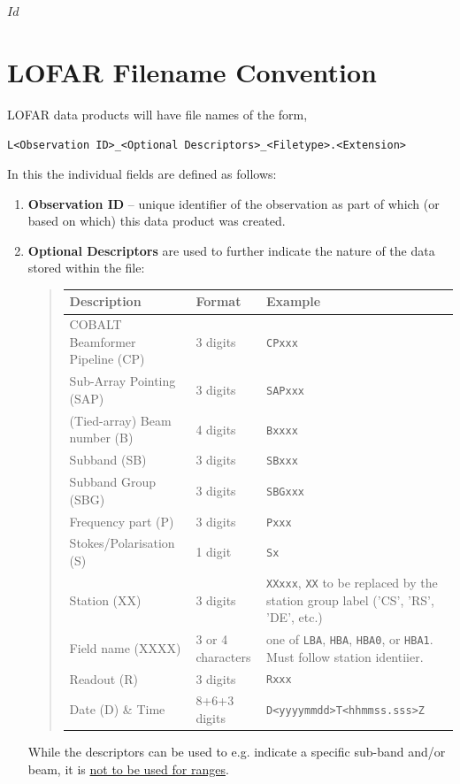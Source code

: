 \svnInfo $Id$

\section{LOFAR Filename Convention}
\label{sec:filenames}

LOFAR data products will have file names of the form,

\begin{center}
  \verb|L<Observation ID>_<Optional Descriptors>_<Filetype>.<Extension>|
\end{center}

In this the individual fields are defined as follows:

\begin{enumerate}
\item \textbf{Observation ID} -- unique identifier of the observation as part of which (or based on which) this data product was created.
\item \textbf{Optional Descriptors} are used to further indicate the
  nature of the data stored within the file:
  \begin{verse}
    \begin{tabular}{|lll|}
      \hline
      \textbf{Description} & \textbf{Format} & \textbf{Example} \\
      \hline \hline
      COBALT Beamformer Pipeline (CP) & 3 digits & \verb|CPxxx|   \\
      Sub-Array Pointing (SAP) & 3 digits & \verb|SAPxxx|   \\
      (Tied-array) Beam number (B)   & 4 digits   & \verb|Bxxxx|   \\
      Subband (SB)      & 3 digits   & \verb|SBxxx| \\
      Subband Group (SBG) & 3 digits & \verb|SBGxxx| \\
      Frequency part (P) & 3 digits & \verb|Pxxx| \\
      Stokes/Polarisation (S) & 1 digit & \verb|Sx| \\
      Station (XX) & 3 digits & \verb|XXxxx|, \verb|XX| to be replaced by the station group label ('CS', 'RS', 'DE', etc.) \\
      Field name (XXXX) & 3 or 4 characters & one of \verb|LBA|, \verb|HBA|, \verb|HBA0|, or \verb|HBA1|. Must follow station identiier. \\
      Readout (R) & 3 digits & \verb|Rxxx| \\
      Date (D) \& Time  & 8+6+3 digits & \verb|D<yyyymmdd>T<hhmmss.sss>Z| \\
      \hline
    \end{tabular}
  \end{verse}
  While the descriptors can be used to e.g. indicate a specific sub-band and/or
  beam, it is \underline{not to be used for ranges}.


\end{enumerate}
